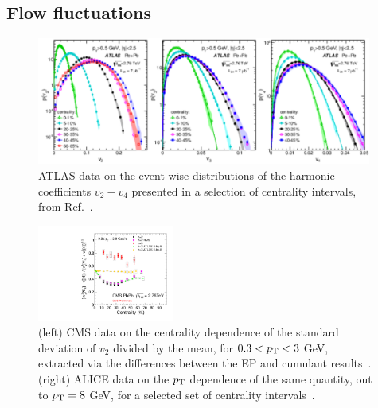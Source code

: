 \subsection{Flow fluctuations}
\begin{figure}[!tb]
\begin{center}
\includegraphics[width=0.98\textwidth]{flowcorrelations_figs/atlas_v2fluc_fig_10.pdf}
\caption[]{
ATLAS data on the event-wise distributions of the harmonic coefficients $v_2 - v_4$ presented in a selection of
centrality intervals, from Ref.~\cite{Aad:2013xma}.
}
\label{fig:pas:fc:flowfluc1}
\end{center}
\end{figure}

\begin{figure}[!tb]
\begin{center}
\includegraphics[width=0.40\textwidth]{flowcorrelations_figs/vnSigmaPrelim.pdf}
\caption[]{
(left) CMS data on the centrality dependence of the standard deviation of $v_2$ 
divided by the mean, for $0.3 < \mbox{$p_{\mathrm{T}}$} < 3$ GeV,
extracted via the differences between the EP and cumulant results~\cite{Chatrchyan:2013kba}.
(right) ALICE data on the $\mbox{$p_{\mathrm{T}}$}$ dependence of the same quantity, out to $\mbox{$p_{\mathrm{T}}$}=8$ GeV, 
for a selected set of centrality
intervals~\cite{Abelev:2012di}.
}
\label{fig:pas:fc:flowfluc2}
\end{center}
\end{figure}

